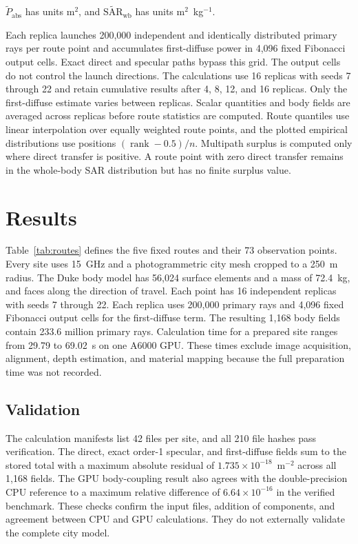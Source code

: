 \documentclass{ieeeaccess}
\begin{document}
$\widetilde{P}_{\mathrm{abs}}$ has units m$^2$, and $\widetilde{\mathrm{SAR}}_{\mathrm{wb}}$ has units m$^2$~kg$^{-1}$.

Each replica launches 200,000 independent and identically distributed primary
rays per route point and accumulates first-diffuse power in 4,096 fixed
Fibonacci output cells. Exact direct and specular paths bypass this grid. The output cells do not control the launch directions.
The calculations use 16 replicas with seeds 7 through 22 and retain cumulative
results after 4, 8, 12, and 16 replicas. Only the first-diffuse estimate varies
between replicas. Scalar quantities and body fields are averaged across replicas
before route statistics are computed. Route quantiles use linear interpolation
over equally weighted route points, and the plotted empirical distributions use
positions $(\operatorname{rank}-0.5)/n$. Multipath surplus is computed
only where direct transfer is positive. A route point with zero direct transfer
remains in the whole-body SAR distribution but has no finite surplus value.

\section{Results}
\label{sec:results}

Table~\ref{tab:routes} defines the five fixed routes and their 73 observation
points. Every site uses 15~GHz and a photogrammetric city mesh cropped to a
250~m radius. The Duke body model has 56,024 surface elements and a mass of
72.4~kg, and faces along the direction of travel. Each point has 16 independent
replicas with seeds 7 through 22. Each replica uses 200,000 primary rays and
4,096 fixed Fibonacci output cells for the first-diffuse term. The resulting 1,168 body fields contain 233.6 million primary rays.
Calculation time for a prepared site ranges from 29.79 to 69.02~s on one A6000
GPU. These times exclude image acquisition, alignment, depth estimation, and
material mapping because the full preparation time was not recorded.

\subsection{Validation}
\label{sec:validation}

The calculation manifests list 42 files per site, and all 210 file hashes pass
verification. The direct, exact order-1 specular, and first-diffuse fields sum
to the stored total with a maximum absolute residual of
$1.735\times10^{-18}$~m$^{-2}$ across all 1,168 fields. The GPU body-coupling
result also agrees with the double-precision CPU reference to a maximum relative
difference of $6.64\times10^{-16}$ in the verified benchmark. These checks
confirm the input files, addition of components, and agreement between CPU and
GPU calculations. They do not externally validate the complete city model.
\end{document}
